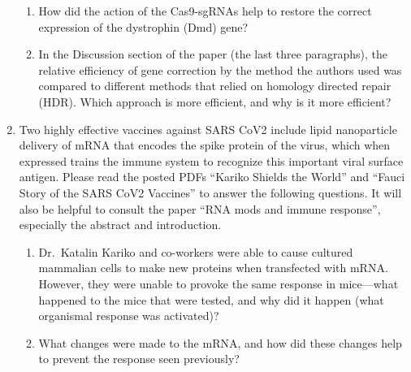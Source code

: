 \documentclass[basic]{inVerba-notes}
\begin{document}
\begin{enumerate}[align=left, leftmargin=0pt, labelindent=\parindent, listparindent=\parindent, labelwidth=0pt, itemindent=!]
\begin{enumerate}
    \item {} How did the action of the Cas9-sgRNAs help to restore the correct expression of the dystrophin (Dmd) gene?
    \basec{\begin{itemize}
      \item 
    \end{itemize}}
    
    \item {} In the Discussion section of the paper (the last three paragraphs), the relative efficiency of gene correction by the method the authors used was compared to different methods that relied on homology directed repair (HDR). Which approach is more efficient, and why is it more efficient?
    \basec{\begin{itemize}
      \item 
    \end{itemize}}
    
  \end{enumerate}

  \item {} Two highly effective vaccines against SARS CoV2 include lipid nanoparticle delivery of mRNA that encodes the spike protein of the virus, which when expressed trains the immune system to recognize this important viral surface antigen. Please read the posted PDFs “Kariko Shields the World” and “Fauci Story of the SARS CoV2 Vaccines” to answer the following questions. It will also be helpful to consult the paper “RNA mods and immune response”, especially the abstract and introduction.
  \begin{enumerate}
    \item {} Dr.\ Katalin Kariko and co-workers were able to cause cultured mammalian cells to make new proteins when transfected with mRNA\@. However, they were unable to provoke the same response in mice---what happened to the mice that were tested, and why did it happen (what organismal response was activated)?
    \basec{\begin{itemize}
      \item 
    \end{itemize}}
    
    \item {} What changes were made to the mRNA, and how did these changes help to prevent the response seen previously?
    \basec{\begin{itemize}
      \item 
    \end{itemize}}
    

\end{enumerate}
\end{enumerate}
\end{document}
